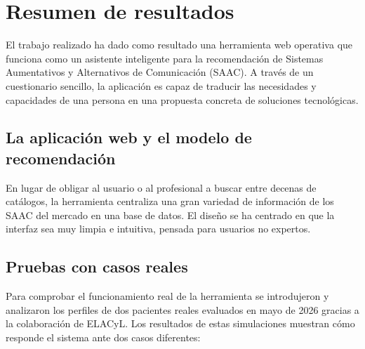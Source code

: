 
\section{Resumen de resultados}
El trabajo realizado ha dado como resultado una herramienta web operativa que funciona como un asistente inteligente para la recomendación de Sistemas Aumentativos y Alternativos de Comunicación (SAAC). A través de un cuestionario sencillo, la aplicación es capaz de traducir las necesidades y capacidades de una persona en una propuesta concreta de soluciones tecnológicas.

\subsection{La aplicación web y el modelo de recomendación}
En lugar de obligar al usuario o al profesional a buscar entre decenas de catálogos, la herramienta centraliza una gran variedad de información de los SAAC del mercado en una base de datos. El diseño se ha centrado en que la interfaz sea muy limpia e intuitiva, pensada para usuarios no expertos.

\subsection{Pruebas con casos reales}
Para comprobar el funcionamiento real de la herramienta se introdujeron y analizaron los perfiles de dos pacientes reales evaluados en mayo de 2026 gracias a la colaboración de ELACyL. Los resultados de estas simulaciones muestran cómo responde el sistema ante dos casos diferentes:

